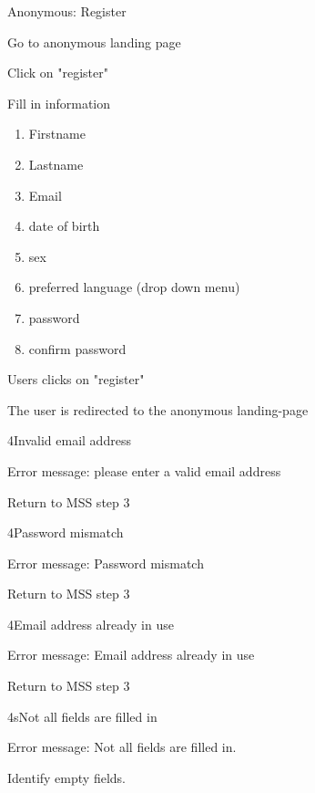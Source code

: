 \begin{uc}{Anonymous: Register}

    \begin{uc-mss}
   	\item Go to anonymous landing page
   	\item Click on "register"
   	\item Fill in information
   	\begin{enumerate}
   	\item Firstname
   	\item Lastname
   	\item Email
   	\item date of birth
   	\item sex
   	\item preferred language (drop down menu)
   	\item password
   	\item confirm password
   	\end{enumerate}
   	\item Users clicks on "register"
   	\item The user is redirected to the anonymous landing-page
    \end{uc-mss}

    \begin{uc-ext}

        \begin{uc-fail}{4}{Invalid email address}
        \item Error message: please enter a valid email address
        \item Return to MSS step 3
        \end{uc-fail}
        
        \begin{uc-fail}{4}{Password mismatch}
        \item Error message: Password mismatch
        \item Return to MSS step 3
		\end{uc-fail}
		
		\begin{uc-fail}{4}{Email address already in use}
		\item Error message: Email address already in use
		\item Return to MSS step 3
		\end{uc-fail}
		
		\begin{uc-fail}{4s}{Not all fields are filled in}
		\item Error message: Not all fields are filled in.
		\item Identify empty fields.
		\end{uc-fail}
	\end{uc-ext}
		

\end{uc}
